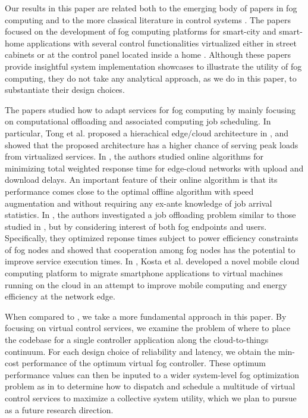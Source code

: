 \documentclass[10pt, journal, letterpaper]{IEEEtran}
\newcommand{\1}{\ensuremath{\mathbf{1}}} %
\begin{document}
Our results in this paper are related both to the emerging body of papers in fog computing \cite{Yannuzzi2017Cities, Faruque16, tong2016hierarchical, Tan2017Online, Xiao2017QoE, Kosta12} and to the more classical literature in control systems \cite{Abdelaal17, Vick16, Liberatore2006Integrated, Ploplys2004Closed, Gatsis2015Control, Pappas15, Yuksel06, Gupta07}. The papers \cite{Yannuzzi2017Cities, Faruque16} focused on the development of fog computing platforms for smart-city and smart-home applications with several control functionalities virtualized either in street cabinets \cite{Yannuzzi2017Cities} or at the control panel located inside a home \cite{Faruque16}. Although these papers provide insightful system implementation showcases to illustrate the utility of fog computing, they do not take any analytical approach, as we do in this paper, to substantiate their design choices.

The papers \cite{tong2016hierarchical, Tan2017Online, Xiao2017QoE, Kosta12} studied how to adapt services for fog computing by mainly focusing on computational offloading and associated computing job scheduling. In particular, Tong et al. proposed a hierachical edge/cloud architecture in \cite{tong2016hierarchical}, and showed that the proposed architecture has a higher chance of serving peak loads from virtualized services. In \cite{Tan2017Online}, the authors studied online algorithms for minimizing total weighted response time for edge-cloud networks with upload and download delays. An important feature of their online algorithm is that its performance comes close to the optimal offline algorithm with speed augmentation and without requiring any ex-ante knowledge of job arrival statistics. In \cite{Xiao2017QoE}, the authors investigated a job offloading problem similar to those studied in \cite{tong2016hierarchical, Tan2017Online}, but by considering interest of both fog endpoints and users. Specifically, they optimized reponse times subject to power efficiency constraints of fog nodes and showed that cooperation among fog nodes has the potential to improve service execution times. In \cite{Kosta12}, Kosta et al. developed a novel mobile cloud computing platform to migrate smartphone applications to virtual machines running on the cloud in an attempt to improve mobile computing and energy efficiency at the network edge.

When compared to \cite{tong2016hierarchical, Tan2017Online, Xiao2017QoE, Kosta12}, we take a more fundamental approach in this paper. By focusing on virtual control services, we examine the problem of where to place the codebase for a single controller application along the cloud-to-things continuum. For each design choice of reliability and latency, we obtain the min-cost performance of the optimum virtual fog controller. These optimum performance values can then be inputed to a wider system-level fog optimization problem as in \cite{tong2016hierarchical, Tan2017Online, Xiao2017QoE} to determine how to dispatch and schedule a multitude of virtual control services to maximize a collective system utility, which we plan to pursue as a future research direction.
\end{document}
